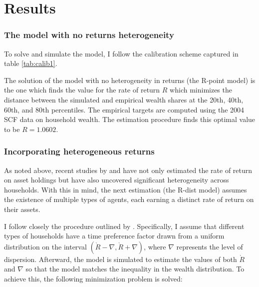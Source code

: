 \onlyinsubfile{\setcounter{section}{3}}
\section{Results}\notinsubfile{\label{sec:results}}

\subsubsection{The model with no returns heterogeneity}

\par To solve and simulate the model, I follow the calibration scheme captured in table \ref{tab:calib1}.
\unskip

\par The solution of the model with no heterogeneity in returns (the R-point model) is the one which finds the value for the rate of return $R$ which minimizes the distance between the simulated and empirical wealth shares at the 20th, 40th, 60th, and 80th percentiles. The empirical targets are computed using the 2004 SCF data on household wealth. The estimation procedure finds this optimal value to be $R = 1.0602$.

\subsubsection{Incorporating heterogeneous returns}

\par As noted above, recent studies by \cite{aflgdmlp20} and \cite{lblcps18} have not only estimated the rate of return on asset holdings but have also uncovered significant heterogeneity across households. With this in mind, the next estimation (the R-dist model) assumes the existence of multiple types of agents, each earning a distinct rate of return on their assets.

\par I follow closely the procedure outlined by \cite{cstw2017}. Specifically, I assume that different types of households have a time preference factor drawn from a uniform distribution on the interval $(\grave{R} - \nabla, \grave{R} + \nabla)$, where $\nabla$ represents the level of dispersion. Afterward, the model is simulated to estimate the values of both $\grave{R}$ and $\nabla$ so that the model matches the inequality in the wealth distribution. To achieve this, the following minimization problem is solved:

